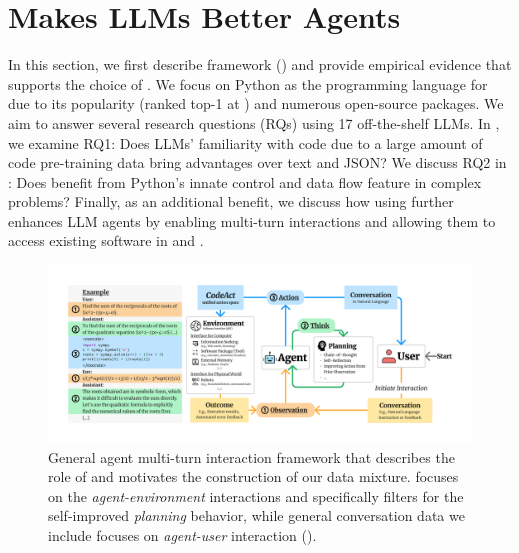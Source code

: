 \section{\approach Makes LLMs Better Agents}

In this section, we first describe \approach framework () and provide empirical evidence that supports the choice of \approach.
% 
We focus on Python as the programming language for \approach due to its popularity (ranked top-1 at \cite{tiobe}) and numerous open-source packages. 
% 
We aim to answer several research questions (RQs) using 17 off-the-shelf LLMs. In , we examine RQ1: Does LLMs' familiarity with code due to a large amount of code pre-training data bring \approach advantages over text and JSON?
% 
We discuss RQ2 in : Does \approach benefit from Python’s innate control and data flow feature in complex problems?
% 
Finally, as an additional benefit, we discuss how using \approach further enhances LLM agents by enabling multi-turn interactions and allowing them to access existing software in  and .

\begin{figure}[!th]
    \centering
    \includegraphics[width=\textwidth]{figures/codeactagent-data.pdf}
    \vspace{-20pt}
    \caption{General agent multi-turn interaction framework that describes the role of \approach and motivates the construction of our data mixture. \dataname focuses on the \textit{agent-environment} interactions and specifically filters for the self-improved \textit{planning} behavior, while general conversation data we include focuses on \textit{agent-user} interaction ().
    }
    \label{fig:llm_agent_framework}
\end{figure}

